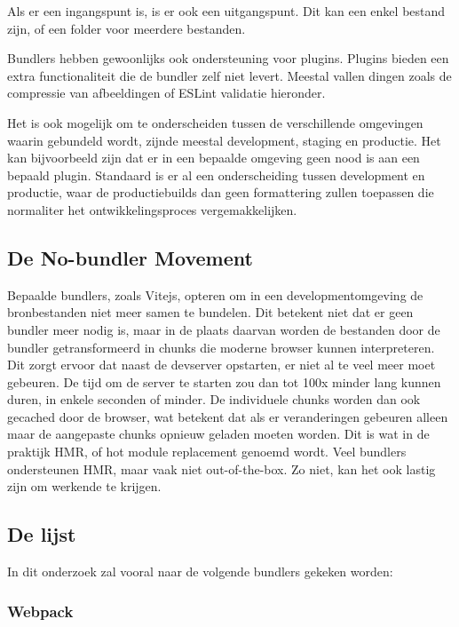 Als er een ingangspunt is, is er ook een uitgangspunt. Dit kan een enkel bestand zijn, of een folder voor meerdere bestanden.

Bundlers hebben gewoonlijks ook ondersteuning voor plugins. Plugins bieden een extra functionaliteit die de bundler zelf niet levert. Meestal vallen dingen zoals de compressie van afbeeldingen of ESLint validatie hieronder.

Het is ook mogelijk om te onderscheiden tussen de verschillende omgevingen waarin gebundeld wordt, zijnde meestal development, staging en productie. Het kan bijvoorbeeld zijn dat er in een bepaalde omgeving geen nood is aan een bepaald plugin. Standaard is er al een onderscheiding tussen development en productie, waar de productiebuilds dan geen formattering zullen toepassen die normaliter het ontwikkelingsproces vergemakkelijken.

\subsection{De No-bundler Movement}

Bepaalde bundlers, zoals Vitejs, opteren om in een developmentomgeving de bronbestanden niet meer samen te bundelen. Dit betekent niet dat er geen bundler meer nodig is, maar in de plaats daarvan worden de bestanden door de bundler getransformeerd in chunks die moderne browser kunnen interpreteren. Dit zorgt ervoor dat naast de devserver opstarten, er niet al te veel meer moet gebeuren. De tijd om de server te starten zou dan tot 100x minder lang kunnen duren, in enkele seconden of minder. De individuele chunks worden dan ook gecached door de browser, wat betekent dat als er veranderingen gebeuren alleen maar de aangepaste chunks opnieuw geladen moeten worden. Dit is wat in de praktijk HMR, of hot module replacement genoemd wordt. Veel bundlers ondersteunen HMR, maar vaak niet out-of-the-box. Zo niet, kan het ook lastig zijn om werkende te krijgen. 


\subsection{De lijst}

In dit onderzoek zal vooral naar de volgende bundlers gekeken worden:

\subsubsection{Webpack}

